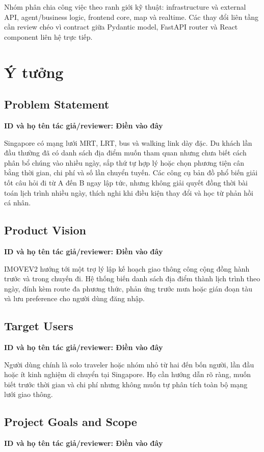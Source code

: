 \documentclass[12pt,a4paper]{article}
\newcommand{\tacgia}{%
  \begin{tcolorbox}[colback=blue!3,colframe=blue!25,boxrule=0.4pt,arc=1mm]
    \small\textbf{ID và họ tên tác giả/reviewer: Điền vào đây}
  \end{tcolorbox}
}
\begin{document}
Nhóm phân chia công việc theo ranh giới kỹ thuật: infrastructure và external API, agent/business logic, frontend core, map và realtime. Các thay đổi liên tầng cần review chéo vì contract giữa Pydantic model, FastAPI router và React component liên hệ trực tiếp.

\section{Ý tưởng}

\subsection{Problem Statement}
\tacgia

Singapore có mạng lưới MRT, LRT, bus và walking link dày đặc. Du khách lần đầu thường đã có danh sách địa điểm muốn tham quan nhưng chưa biết cách phân bổ chúng vào nhiều ngày, sắp thứ tự hợp lý hoặc chọn phương tiện cân bằng thời gian, chi phí và số lần chuyển tuyến. Các công cụ bản đồ phổ biến giải tốt câu hỏi đi từ A đến B ngay lập tức, nhưng không giải quyết đồng thời bài toán lịch trình nhiều ngày, thích nghi khi điều kiện thay đổi và học từ phản hồi cá nhân.

\subsection{Product Vision}
\tacgia

IMOVEV2 hướng tới một trợ lý lập kế hoạch giao thông công cộng đồng hành trước và trong chuyến đi. Hệ thống biến danh sách địa điểm thành lịch trình theo ngày, đính kèm route đa phương thức, phản ứng trước mưa hoặc gián đoạn tàu và lưu preference cho người dùng đăng nhập.

\subsection{Target Users}
\tacgia

Người dùng chính là solo traveler hoặc nhóm nhỏ từ hai đến bốn người, lần đầu hoặc ít kinh nghiệm di chuyển tại Singapore. Họ cần hướng dẫn rõ ràng, muốn biết trước thời gian và chi phí nhưng không muốn tự phân tích toàn bộ mạng lưới giao thông.

\subsection{Project Goals and Scope}
\tacgia
\end{document}
